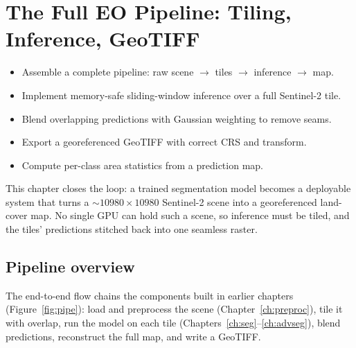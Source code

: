\chapter{The Full EO Pipeline: Tiling, Inference, GeoTIFF}
\label{ch:pipeline}


\begin{objbox}
\begin{itemize}[leftmargin=1.2em,nosep]
  \item Assemble a complete pipeline: raw scene $\to$ tiles $\to$ inference $\to$ map.
  \item Implement memory-safe sliding-window inference over a full Sentinel-2 tile.
  \item Blend overlapping predictions with Gaussian weighting to remove seams.
  \item Export a georeferenced GeoTIFF with correct CRS and transform.
  \item Compute per-class area statistics from a prediction map.
\end{itemize}
\end{objbox}

This chapter closes the loop: a trained segmentation model becomes a deployable
system that turns a $\sim$$10980\times10980$ Sentinel-2 scene into a
georeferenced land-cover map. No single GPU can hold such a scene, so inference
must be tiled, and the tiles' predictions stitched back into one seamless raster.

\section{Pipeline overview}

The end-to-end flow chains the components built in earlier chapters
(Figure~\ref{fig:pipe}): load and preprocess the scene
(Chapter~\ref{ch:preproc}), tile it with overlap, run the model on each tile
(Chapters~\ref{ch:seg}--\ref{ch:advseg}), blend predictions, reconstruct the
full map, and write a GeoTIFF.


